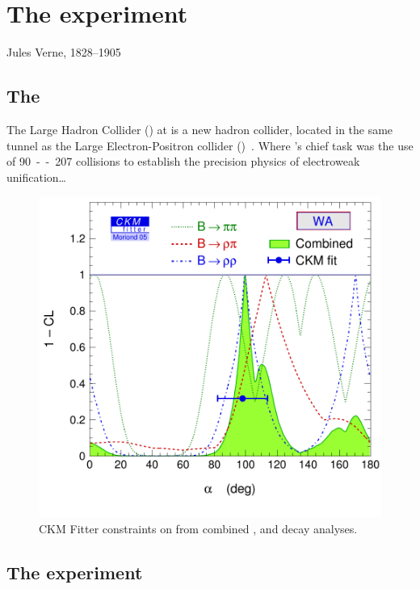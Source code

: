 \chapter{The \LHCb experiment}
\label{chap:MoreStuff}

{Jules Verne, 1828--1905}

\section{The \LHC}
The Large Hadron Collider (\LHC) at \CERN is a new hadron collider,
located in the same tunnel as the Large Electron-Positron collider 
(\LEP)~\cite{Brianti:2004qq}. Where \LEP's chief task was the use 
of \unit{90--207}{\GeV} \epluseminus collisions to establish the 
precision physics of electroweak unification\dots

\begin{figure}
  \includegraphics[width=\largefigwidth]{ckmfitter-alpha-combined}
  \caption[CKM Fitter constraints on \alphaCKM.]%
  {CKM Fitter constraints on \alphaCKM from combined \BToPiPi, 
    \BToRhoPi and \BToRhoRho decay analyses.}
  \label{fig:CKMFitter}
\end{figure}

\section{The \LHCb experiment}
\label{sec:LHCbInDetail}

